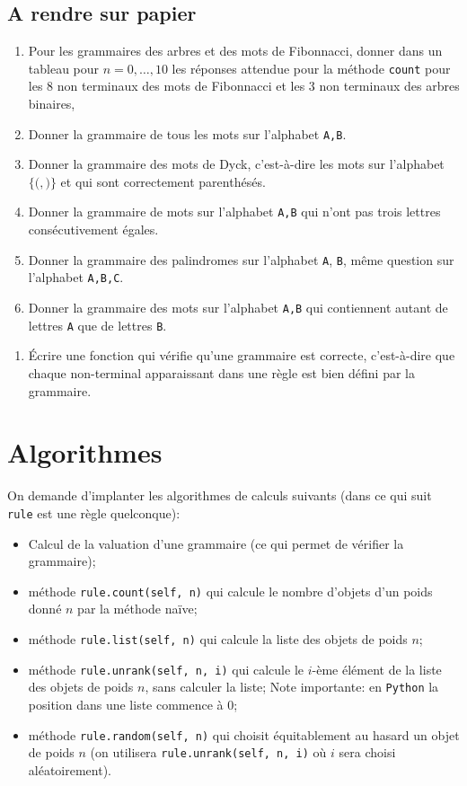 \documentclass[11pt]{article}
\newcounter{asuivre}
\newenvironment{ask}{\begin{enumerate}}%
                       {\setcounter{asuivre}{\theenumi}\end{enumerate}}
\newenvironment{asks}{\begin{enumerate}\setcounter{enumi}{\theasuivre}}%
                       {\setcounter{asuivre}{\theenumi}\end{enumerate}}
\newcommand{\Python}{\texttt{Python}}
\begin{document}
\subsection{A rendre sur papier}

\begin{ask}
\item Pour les grammaires des arbres et des mots de Fibonnacci, donner dans un
  tableau pour $n=0,\dots,10$ les réponses attendue pour la méthode
  \texttt{count} pour les $8$ non terminaux des mots de Fibonnacci et les 3 non terminaux des arbres binaires,
\item Donner la grammaire de tous les mots sur l'alphabet \texttt{A,B}.
\item Donner la grammaire des mots de Dyck, c'est-à-dire les mots sur
  l'alphabet $\{\texttt{(}, \texttt{)}\}$ et qui sont correctement
  parenthésés.
\item Donner la grammaire de mots sur l'alphabet \texttt{A,B} qui n'ont pas
  trois lettres consécutivement égales.
\item Donner la grammaire des palindromes sur l'alphabet \texttt{A},
  \texttt{B}, même question sur l'alphabet \texttt{A,B,C}.
\item Donner la grammaire des mots sur l'alphabet \texttt{A,B} qui
  contiennent autant de lettres \texttt{A} que de lettres \texttt{B}.
\end{ask}

\begin{asks}
\item Écrire une fonction qui vérifie qu'une grammaire est correcte,
  c'est-à-dire que chaque non-terminal apparaissant dans une règle est bien
  défini par la grammaire.
\end{asks}



\section{Algorithmes}

On demande d'implanter les algorithmes de calculs suivants (dans ce qui suit
\texttt{rule} est une règle quelconque):
\begin{itemize}
\item Calcul de la valuation d'une grammaire (ce qui permet de vérifier la
  grammaire);
\item méthode \verb+rule.count(self, n)+ qui calcule le nombre d'objets d'un
  poids donné $n$ par la méthode naïve;
\item méthode \verb+rule.list(self, n)+ qui calcule la liste des objets de poids
  $n$;
\item méthode \verb+rule.unrank(self, n, i)+ qui calcule le $i$-ème élément de
  la liste des objets de poids $n$, sans calculer la liste; Note importante:
  en \Python{} la position dans une liste commence à $0$;
\item méthode \verb+rule.random(self, n)+ qui choisit équitablement au hasard
  un objet de poids $n$ (on utilisera \verb+rule.unrank(self, n, i)+ où $i$
  sera choisi aléatoirement).
\end{itemize}
\end{document}
